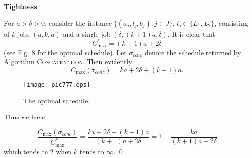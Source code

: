 \documentclass[12pt,a4paper]{article}
\begin{document}
\noindent \textbf{Tightness}.

\smallskip

\noindent For $a>\delta >0$, consider the instance $\{(a_j,l_j,b_j):
j\in J\}$, $l_j\in \{L_1,L_2\}$,  consisting of $k$ jobs $(a,0,a)$
and a single job $(\delta, (k+1)a, \delta)$. It is clear that
$$C_{\max}^*=(k+1)a+2\delta$$
(see Fig. 8 for the optimal schedule). Let $\sigma_{conc}$ denote
the schedule returned by Algorithm \textsc{Concatenation}. Then
evidently
$$C_{\max}(\sigma_{conc})=ka+2\delta+(k+1)a.$$
\begin{figure}[h!]
\vspace{1mm}
\begin{center}
\texttt{[image: pic777.eps]}
  \caption{The optimal schedule.}
\end{center}
\end{figure}
Thus we have

$$\frac{C_{\max}(\sigma_{conc})}{C_{\max}^*}=
\frac{ka+2\delta+(k+1)a}{(k+1)a+2\delta}=1+\frac{ka}{(k+1)a+2\delta}$$
which tends to $2$ when $k$ tends to $\infty$. \qed






\end{document}
